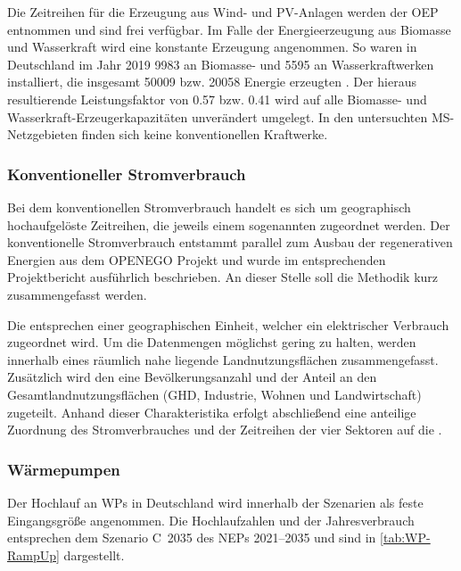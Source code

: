 

Die Zeitreihen für die Erzeugung aus Wind- und \gls{PV}-Anlagen werden der \gls{OEP} \cite{OEP} entnommen und sind frei verfügbar.
Im Falle der Energieerzeugung aus Biomasse und Wasserkraft wird eine konstante Erzeugung angenommen.
So waren in Deutschland im Jahr \num{2019} \SI{9983}{\mw} an Biomasse- und \SI{5595}{\mw} an Wasserkraftwerken installiert, die insgesamt \SI{50009}{\gwh} bzw. \SI{20058}{\gwh} Energie erzeugten \cite{BMWi2020}.
Der hieraus resultierende Leistungsfaktor von \num{0.57} bzw. \num{0.41} wird auf alle Biomasse- und Wasserkraft-Erzeugerkapazitäten unverändert umgelegt.
In den untersuchten \gls{MS}-Netzgebieten finden sich keine konventionellen Kraftwerke.


\subsubsection{Konventioneller Stromverbrauch}

Bei dem konventionellen Stromverbrauch handelt es sich um geographisch hochaufgelöste Zeitreihen, die jeweils einem sogenannten \Lastgebiet zugeordnet werden.
Der konventionelle Stromverbrauch entstammt parallel zum Ausbau der regenerativen Energien aus dem \gls{OPENEGO} Projekt und wurde im entsprechenden Projektbericht \cite{Mueller2019} ausführlich beschrieben.
An dieser Stelle soll die Methodik kurz zusammengefasst werden.\medskip

Die \Lastgebiete entsprechen einer geographischen Einheit, welcher ein elektrischer Verbrauch zugeordnet wird.
Um die Datenmengen möglichst gering zu halten, werden innerhalb eines \Lastgebietes räumlich nahe liegende Landnutzungsflächen zusammengefasst.
Zusätzlich wird den \Lastgebieten eine Bevölkerungsanzahl und der Anteil an den Gesamtlandnutzungsflächen (\gls{GHD}, Industrie, Wohnen und Landwirtschaft) zugeteilt.
Anhand dieser Charakteristika erfolgt abschließend eine anteilige Zuordnung des Stromverbrauches und der Zeitreihen der vier Sektoren auf die \Lastgebietedot.


\subsubsection{Wärmepumpen}

Der Hochlauf an \glspl{WP} in Deutschland wird innerhalb der Szenarien als feste Eingangsgröße angenommen.
Die Hochlaufzahlen und der Jahresverbrauch entsprechen dem Szenario C~\num{2035} des \glspl{NEP} \numrange[range-phrase=~{--}~]{2021}{2035} \cite{BNetzA2020} und sind in \autoref{tab:WP-RampUp} dargestellt.

